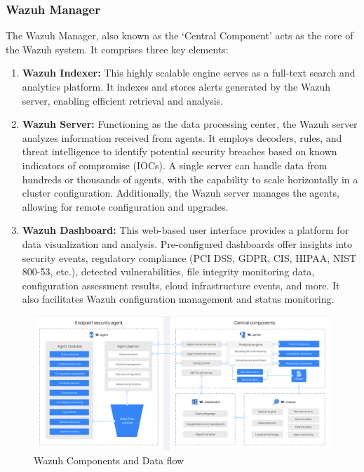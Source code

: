 \subsubsection{Wazuh Manager}

The Wazuh Manager, also known as the `Central Component' acts as the core of the Wazuh system. It comprises three key elements:

\begin{enumerate}
    \item \textbf{Wazuh Indexer:} This highly scalable engine serves as a full-text search and analytics platform. It indexes and stores alerts generated by the Wazuh server, enabling efficient retrieval and analysis.

    \item \textbf{Wazuh Server:} Functioning as the data processing center, the Wazuh server analyzes information received from agents. It employs decoders, rules, and threat intelligence to identify potential security breaches based on known indicators of compromise (IOCs). A single server can handle data from hundreds or thousands of agents, with the capability to scale horizontally in a cluster configuration. Additionally, the Wazuh server manages the agents, allowing for remote configuration and upgrades.

    \item \textbf{Wazuh Dashboard:} This web-based user interface provides a platform for data visualization and analysis. Pre-configured dashboards offer insights into security events, regulatory compliance (PCI DSS, GDPR, CIS, HIPAA, NIST 800-53, etc.), detected vulnerabilities, file integrity monitoring data, configuration assessment results, cloud infrastructure events, and more. It also facilitates Wazuh configuration management and status monitoring.
\end{enumerate}

\begin{figure} [H]
\centering
\includegraphics[width=\textwidth]{images/introduction/components-data-flow.png}
\caption{Wazuh Components and Data flow}
\label{fig:wazuhcomponents}
\end{figure}

